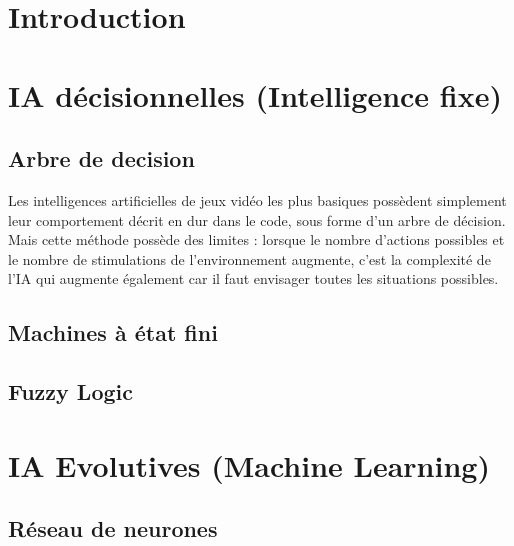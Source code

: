 \documentclass[asi]{picINSA}
\begin{document}
	
	\couverture{}

\tableofcontents{}

\chapter{Introduction}

\chapter{IA décisionnelles (Intelligence fixe)}
\section{Arbre de decision}
Les intelligences artificielles de jeux vidéo les plus basiques possèdent simplement leur comportement décrit en dur dans le code, sous forme d’un arbre de décision. \\

Mais cette méthode possède des limites : lorsque le nombre d’actions possibles et le nombre de stimulations de l’environnement augmente, c’est la complexité de l’IA qui augmente également car il faut envisager toutes les situations possibles.

\section{Machines à état fini}
\section{Fuzzy Logic}
  
\chapter{IA Evolutives (Machine Learning)}
\section{Réseau de neurones}
\end{document}
